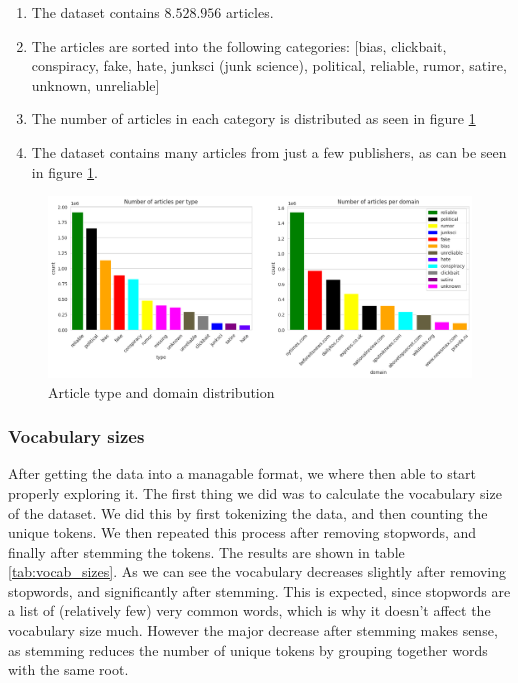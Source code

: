 \begin{enumerate}
  \item The dataset contains $ 8.528.956 $ articles.
  \item The articles are sorted into the following categories: [bias, clickbait, conspiracy, fake, hate, junksci (junk
    science), political, reliable, rumor, satire, unknown, unreliable]
  \item The number of articles in each category is distributed as seen in figure \ref{fig:combdist}
  \item The dataset contains many articles from just a few publishers, as can be seen in figure \ref{fig:combdist}.
\end{enumerate}

\begin{figure}[htpb]
  \centering
  \includegraphics[width=1\textwidth]{combdist}
  \caption{Article type and domain distribution}
  \label{fig:combdist}
\end{figure}
\subsubsection{Vocabulary sizes}
After getting the data into a managable format, we where then able to start properly exploring it. The first thing we
did was to calculate the vocabulary size of the dataset. We did this by first tokenizing the data, and then counting the
unique tokens. We then repeated this process after removing stopwords, and finally after stemming the tokens. The
results are shown in table \ref{tab:vocab_sizes}. As we can see the vocabulary decreases slightly after removing
stopwords, and significantly after stemming. This is expected, since stopwords are a list of (relatively few) very
common words, which is why it doesn't affect the vocabulary size much. However the major decrease after stemming makes
sense, as stemming reduces the number of unique tokens by grouping together words with the same root.


